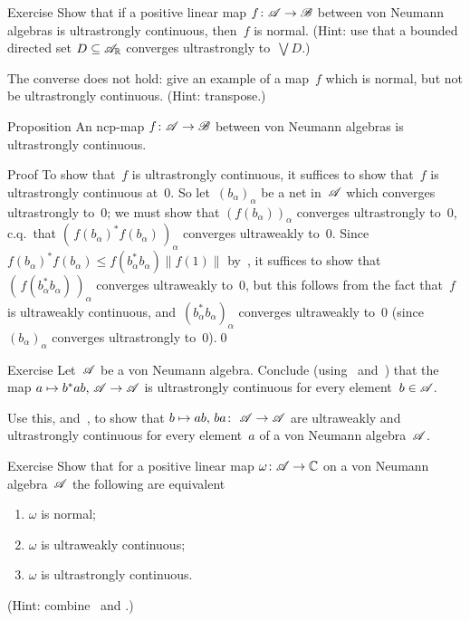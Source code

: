\documentclass[a]{subfiles}
\begin{document}
\begin{parsec}
\begin{point}[p-uwcont]{Exercise}
Show that if a positive linear map $f\colon \mathscr{A}\to\mathscr{B}$
between von Neumann algebras 
is ultrastrongly continuous, then~$f$ is normal.
(Hint: use that a bounded directed set 
$D\subseteq \mathscr{A}_{\mathbb{R}}$ converges ultrastrongly to~$\bigvee D$.)

The converse does not hold: give an example of a map~$f$ 
which is normal, but 
not be ultrastrongly continuous. (Hint: transpose.)
\end{point}
\begin{point}[cp-uscont]{Proposition}%
An ncp-map $f\colon \mathscr{A}\to\mathscr{B}$
between von Neumann algebras is 
ultrastrongly continuous.
\begin{point}{Proof}%
To show that~$f$
is ultrastrongly continuous,
it suffices to show that~$f$ is ultrastrongly continuous at~$0$.
So let~$(b_\alpha)_\alpha$ be a net in~$\mathscr{A}$
which converges ultrastrongly to~$0$;
we must show that $(f(b_\alpha))_\alpha$
converges ultrastrongly to~$0$, c.q.~that
$(\,f(b_\alpha)^*f(b_\alpha)\,)_\alpha$ converges ultraweakly to~$0$.
Since
$f(b_\alpha)^*f(b_\alpha) \leq f(b_\alpha^*b_\alpha) \|f(1)\|$
by~, 
it suffices to show that~$(\,f(b_\alpha^*b_\alpha)\,)_\alpha$
converges ultraweakly to~$0$,
but this follows from the
fact that~$f$ is ultraweakly continuous,
and~$(b_\alpha^*b_\alpha)_\alpha$
converges ultraweakly to~$0$
(since~$(b_\alpha)_\alpha$ converges ultrastrongly to~$0$).\qed
\end{point}
\end{point}
\begin{point}{Exercise}%
Let~$\mathscr{A}$ be a von Neumann algebra.
Conclude (using~ and~)
that the map $a\mapsto b^*ab,\,\mathscr{A}\to\mathscr{A}$
is ultrastrongly continuous for every
 element~$b\in\mathscr{A}$.

Use this,
and~,
to
show that $b\mapsto ab,\,ba\colon\ \mathscr{A}\to\mathscr{A}$
are ultraweakly and ultrastrongly continuous
for every element~$a$ of a von Neumann algebra~$\mathscr{A}$.
\end{point}
\begin{point}[npuws]{Exercise}%
Show that for a positive linear map $\omega \colon \mathscr{A}\to\mathbb{C}$
on a von Neumann algebra~$\mathscr{A}$
the following are equivalent
\begin{enumerate}
\item
	$\omega$ is normal;
\item
	$\omega$ is ultraweakly continuous;
\item
	$\omega$ is ultrastrongly continuous.
\end{enumerate}
(Hint: combine~ and .)
\end{point}
\end{parsec}
\end{document}
